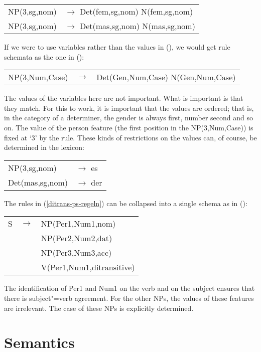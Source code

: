 \ea
\begin{tabular}[t]{@{}l@{ }l}
NP(3,sg,nom)  & $\to$ Det(fem,sg,nom) N(fem,sg,nom)\\
NP(3,sg,nom)  & $\to$ Det(mas,sg,nom) N(mas,sg,nom)\\
\end{tabular}
\z
If we were to use variables rather than the values in (), we would get rule schemata as the
one in ():
\ea
\label{Regel-mit-Variablen}
\begin{tabular}[t]{@{}l@{ }l@{ }l}
NP({3},{Num},{Case}) & $\to$ & Det(Gen,{Num},{Case}) N(Gen,{Num},{Case})\\
\end{tabular}
\z
The values of the variables here are not important. What is important is that they match. For this
to work, it is important that the values are ordered; that is, in the category of a determiner, the gender is always first, number
second and so on. The value of the person feature (the first position in the NP(3,Num,Case)) is fixed at `3' by the rule. These
kinds of restrictions on the values can, of course, be determined in the lexicon: 
\ea
\label{ex-categories-with-features}
\begin{tabular}[t]{@{}l@{ }l}
NP(3,sg,nom)  & $\to$ es\\
Det(mas,sg,nom)  & $\to$ der\\
\end{tabular}
\z

\noindent
The rules in (\ref{ditrans-ps-regeln})  can be collapsed into a single schema as in ():
\ea
\label{ditrans-schema}
\begin{tabular}[t]{@{}l@{ }l@{ }l}
S  & $\to$ & NP({Per1},{Num1},{nom}) \\
   &       & NP(Per2,Num2,{dat})\\
   &       & NP(Per3,Num3,{acc})\\
   &       & V({Per1},{Num1},ditransitive)\\
\end{tabular}
\z
The identification of Per1 and Num1 on the verb and on the subject ensures that there is subject"=verb agreement.
For the other NPs, the values of these features are irrelevant. The case of these NPs is explicitly determined.

\section{Semantics}
\label{sec-PSG-Semantik}


